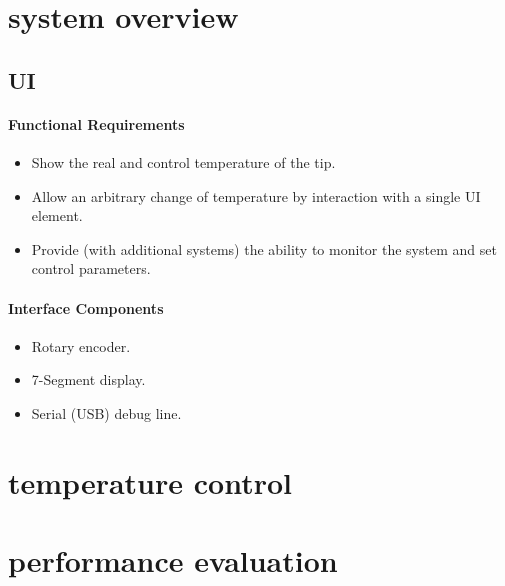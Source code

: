 
\section{system overview}



\subsection{UI}
\paragraph{Functional Requirements}

\begin{itemize}
	\item Show the real and control temperature of the tip.
	\item Allow an arbitrary change of temperature by interaction
		with a single UI element.
	\item Provide (with additional systems) the ability to monitor
		the system and set control parameters.
\end{itemize}
\paragraph{Interface Components}
\begin{itemize}
	\item Rotary encoder.
	\item 7-Segment display.
	\item Serial (USB) debug line.
\end{itemize}

\section{temperature control}

\section{performance evaluation}



